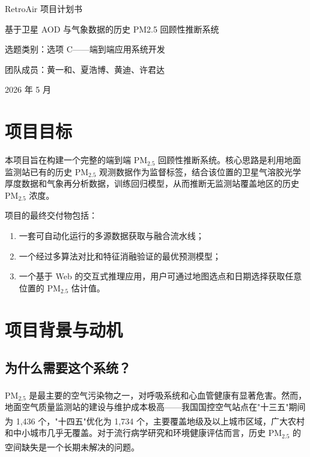 \documentclass[UTF8,zihao=-4,a4paper]{ctexart}
\newcommand{\pmfine}{PM$_{2.5}$}
\let\oldcite\cite
\renewcommand{\cite}[1]{\textsuperscript{\oldcite{#1}}}
\begin{document}
\begin{titlepage}
  \centering
  \vspace*{2.6cm}
  {\heiti RetroAir 项目计划书\par}
  \vspace{0.8cm}
  {\heiti 基于卫星 AOD 与气象数据的历史 PM2.5 回顾性推断系统\par}
  \vspace{1.8cm}
  {选题类别：选项 C——端到端应用系统开发\par}
  \vspace{0.8cm}
  {团队成员：黄一和、夏浩博、黄迪、许君达\par}
  \vfill
  {2026 年 5 月\par}
\end{titlepage}

\section{项目目标}

本项目旨在构建一个完整的端到端 \pmfine{} 回顾性推断系统。核心思路是利用地面监测站已有的历史 \pmfine{} 观测数据作为监督标签，结合该位置的卫星气溶胶光学厚度数据和气象再分析数据，训练回归模型，从而推断无监测站覆盖地区的历史 \pmfine{} 浓度。

项目的最终交付物包括：
\begin{enumerate}
  \item 一套可自动化运行的多源数据获取与融合流水线；
  \item 一个经过多算法对比和特征消融验证的最优预测模型；
  \item 一个基于 Web 的交互式推理应用，用户可通过地图选点和日期选择获取任意位置的 \pmfine{} 估计值。
\end{enumerate}

\section{项目背景与动机}

\subsection{为什么需要这个系统？}

\pmfine{} 是最主要的空气污染物之一，对呼吸系统和心血管健康有显著危害\cite{who2021}。然而，地面空气质量监测站的建设与维护成本极高——我国国控空气站点在"十三五"期间为 1,436 个，"十四五"优化为 1,734 个，主要覆盖地级及以上城市区域\cite{mee2020}，广大农村和中小城市几乎无覆盖。对于流行病学研究和环境健康评估而言，历史 \pmfine{} 的空间缺失是一个长期未解决的问题\cite{holloway2021}。
\end{document}
